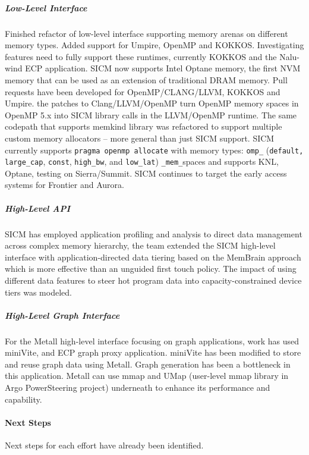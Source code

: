 	\subparagraph{Low-Level Interface} Finished refactor of low-level interface supporting memory arenas on different memory types. Added support for Umpire, OpenMP and KOKKOS. Investigating features need to fully support these runtimes, currently KOKKOS and the Nalu-wind ECP application. SICM now supports Intel Optane memory, the first NVM memory that can be used as an extension of traditional DRAM memory.
	Pull requests have been developed for OpenMP/CLANG/LLVM, KOKKOS and Umpire. the patches to Clang/LLVM/OpenMP turn OpenMP memory spaces in OpenMP 5.x into SICM library calls in the LLVM/OpenMP runtime. The same codepath that supports memkind library was refactored to support multiple custom memory allocators – more general than just SICM support.
	SICM currently supports \texttt{pragma openmp allocate} with  memory types: \texttt{omp\_} (\texttt{default,} \texttt{large\_cap}, \texttt{const}, \texttt{high\_bw}, and \texttt{low\_lat}) \texttt{\_mem\_}spaces and supports KNL, Optane, testing on Sierra/Summit.  SICM continues to target the early access systems for Frontier and Aurora.
	\subparagraph{High-Level API} SICM has employed application profiling and analysis to direct data management across complex memory hierarchy, the team extended the SICM high-level interface with application-directed data tiering based on the MemBrain approach which is more effective than an unguided first touch policy.  The impact of using different data features to steer hot program data into capacity-constrained device tiers was modeled.
	\subparagraph{High-Level Graph Interface} For the Metall high-level interface focusing on graph applications, work has used miniVite, and ECP graph proxy application. miniVite has been modified to store and reuse graph data using Metall.  Graph generation has been a bottleneck in this application. Metall can use mmap and UMap (user-level mmap library in Argo PowerSteering project) underneath to enhance its performance and capability.


\paragraph{Next Steps} %
Next steps for each effort have already been identified.

